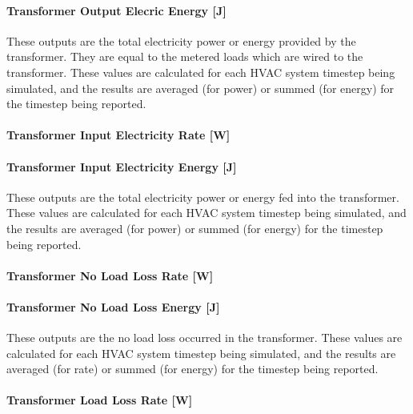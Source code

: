 \paragraph{Transformer Output Elecric Energy {[}J{]}}\label{transformer-output-elecric-energy-j}

These outputs are the total electricity power or energy provided by the transformer. They are equal to the metered loads which are wired to the transformer. These values are calculated for each HVAC system timestep being simulated, and the results are averaged (for power) or summed (for energy) for the timestep being reported.

\paragraph{Transformer Input Electricity Rate {[}W{]}}\label{transformer-input-electric-power-w}

\paragraph{Transformer Input Electricity Energy {[}J{]}}\label{transformer-input-electric-energy-j}

These outputs are the total electricity power or energy fed into the transformer. These values are calculated for each HVAC system timestep being simulated, and the results are averaged (for power) or summed (for energy) for the timestep being reported.

\paragraph{Transformer No Load Loss Rate {[}W{]}}\label{transformer-no-load-loss-rate-w}

\paragraph{Transformer No Load Loss Energy {[}J{]}}\label{transformer-no-load-loss-energy-j}

These outputs are the no load loss occurred in the transformer. These values are calculated for each HVAC system timestep being simulated, and the results are averaged (for rate) or summed (for energy) for the timestep being reported.

\paragraph{Transformer Load Loss Rate {[}W{]}}\label{transformer-load-loss-rate-w}


